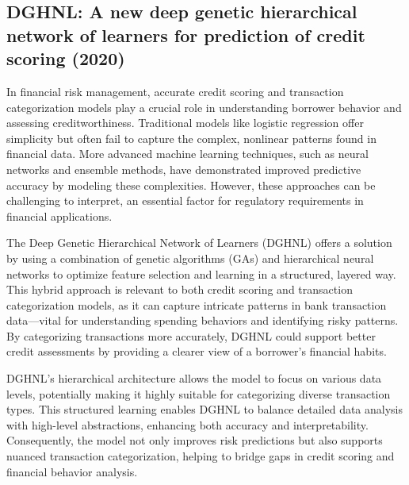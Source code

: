 \documentclass[12pt,letterpaper]{article}
\begin{document}
\subsection{DGHNL: A new deep genetic hierarchical network of learners for prediction of credit scoring (2020)}

In financial risk management, accurate credit scoring and transaction categorization models play a crucial role in understanding borrower behavior and assessing creditworthiness. Traditional models like logistic regression offer simplicity but often fail to capture the complex, nonlinear patterns found in financial data. More advanced machine learning techniques, such as neural networks and ensemble methods, have demonstrated improved predictive accuracy by modeling these complexities. However, these approaches can be challenging to interpret, an essential factor for regulatory requirements in financial applications.

The Deep Genetic Hierarchical Network of Learners (DGHNL) offers a solution by using a combination of genetic algorithms (GAs) and hierarchical neural networks to optimize feature selection and learning in a structured, layered way. This hybrid approach is relevant to both credit scoring and transaction categorization models, as it can capture intricate patterns in bank transaction data—vital for understanding spending behaviors and identifying risky patterns. By categorizing transactions more accurately, DGHNL could support better credit assessments by providing a clearer view of a borrower’s financial habits.

DGHNL’s hierarchical architecture allows the model to focus on various data levels, potentially making it highly suitable for categorizing diverse transaction types. This structured learning enables DGHNL to balance detailed data analysis with high-level abstractions, enhancing both accuracy and interpretability. Consequently, the model not only improves risk predictions but also supports nuanced transaction categorization, helping to bridge gaps in credit scoring and financial behavior analysis.




\end{document}
